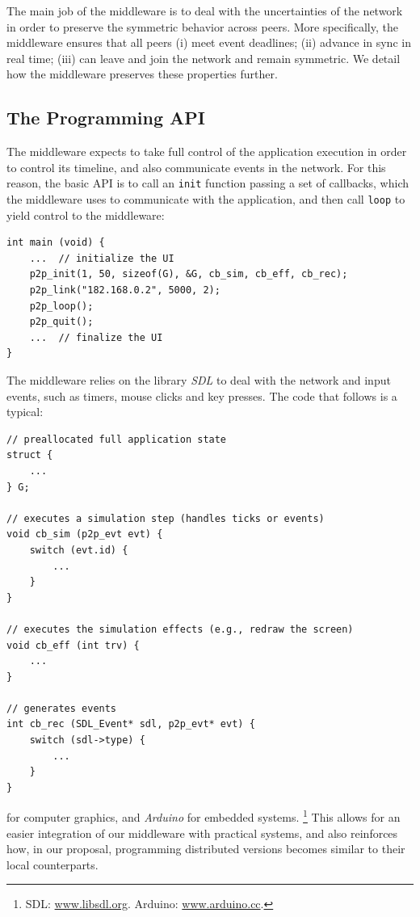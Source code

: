 \documentclass[10pt,journal,compsoc]{IEEEtran}
\newcommand{\code}[1]  {\texttt{\footnotesize{#1}}}
\begin{document}
The main job of the middleware is to deal with the uncertainties of the
network in order to preserve the symmetric behavior across peers.
More specifically, the middleware ensures that all peers
    (i)   meet event deadlines;
    (ii)  advance in sync in real time;
    (iii) can leave and join the network and remain symmetric.
We detail how the middleware preserves these properties further.

\subsection{The Programming API}
\label{sec.tml.api}

The middleware expects to take full control of the application execution in
order to control its timeline, and also communicate events in the network.
For this reason, the basic API is to call an \code{init} function passing a
set of callbacks, which the middleware uses to communicate with the
application, and then call \code{loop} to yield control to the middleware:

{\footnotesize
\begin{verbatim}
int main (void) {
    ...  // initialize the UI
    p2p_init(1, 50, sizeof(G), &G, cb_sim, cb_eff, cb_rec);
    p2p_link("182.168.0.2", 5000, 2);
    p2p_loop();
    p2p_quit();
    ...  // finalize the UI
}
\end{verbatim}
}


The middleware relies on the library \emph{SDL} to deal with the network and
input events, such as timers, mouse clicks and key presses.
The code that follows is a typical:

{\footnotesize
\begin{verbatim}
// preallocated full application state
struct {
    ...
} G;

// executes a simulation step (handles ticks or events)
void cb_sim (p2p_evt evt) {
    switch (evt.id) {
        ...
    }
}

// executes the simulation effects (e.g., redraw the screen)
void cb_eff (int trv) {
    ...
}

// generates events
int cb_rec (SDL_Event* sdl, p2p_evt* evt) {
    switch (sdl->type) {
    	...
    }
}

\end{verbatim}
}


for computer graphics, and
\emph{Arduino} for embedded systems.%
\footnote{SDL: \url{www.libsdl.org}. Arduino: \url{www.arduino.cc}.}
This allows for an easier integration of our middleware with practical systems,
and also reinforces how, in our proposal, programming distributed versions
becomes similar to their local counterparts.
\end{document}
